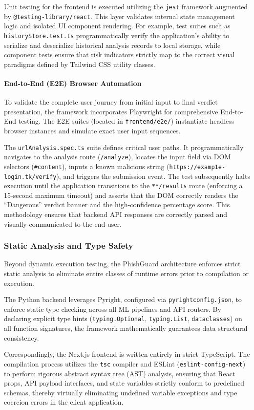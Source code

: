 Unit testing for the frontend is executed utilizing the \texttt{jest}
framework augmented by \texttt{@testing-library/react}. This layer
validates internal state management logic and isolated UI component
rendering. For example, test suites such as
\texttt{historyStore.test.ts} programmatically verify the application's
ability to serialize and deserialize historical analysis records to
local storage, while component tests ensure that risk indicators
strictly map to the correct visual paradigms defined by Tailwind CSS
utility classes.

\paragraph{End-to-End (E2E) Browser
Automation}\label{end-to-end-e2e-browser-automation}

To validate the complete user journey from initial input to final
verdict presentation, the framework incorporates Playwright for
comprehensive End-to-End testing. The E2E suites (located in
\texttt{frontend/e2e/}) instantiate headless browser instances and
simulate exact user input sequences.

The \texttt{urlAnalysis.spec.ts} suite defines critical user paths. It
programmatically navigates to the analysis route (\texttt{/analyze}),
locates the input field via DOM selectors (\texttt{\#content}), inputs a
known malicious string (\texttt{https://examp1e-login.tk/verify}), and
triggers the submission event. The test subsequently halts execution
until the application transitions to the \texttt{**/results} route
(enforcing a 15-second maximum timeout) and asserts that the DOM
correctly renders the ``Dangerous'' verdict banner and the
high-confidence percentage score. This methodology ensures that backend
API responses are correctly parsed and visually communicated to the
end-user.

\subsubsection{Static Analysis and Type
Safety}\label{static-analysis-and-type-safety}

Beyond dynamic execution testing, the PhishGuard architecture enforces
strict static analysis to eliminate entire classes of runtime errors
prior to compilation or execution.

The Python backend leverages Pyright, configured via
\texttt{pyrightconfig.json}, to enforce static type checking across all
ML pipelines and API routers. By declaring explicit type hints
(\texttt{typing.Optional}, \texttt{typing.List}, \texttt{dataclasses})
on all function signatures, the framework mathematically guarantees data
structural consistency.

Correspondingly, the Next.js frontend is written entirely in strict
TypeScript. The compilation process utilizes the \texttt{tsc} compiler
and ESLint (\texttt{eslint-config-next}) to perform rigorous abstract
syntax tree (AST) analysis, ensuring that React props, API payload
interfaces, and state variables strictly conform to predefined schemas,
thereby virtually eliminating undefined variable exceptions and type
coercion errors in the client application.

